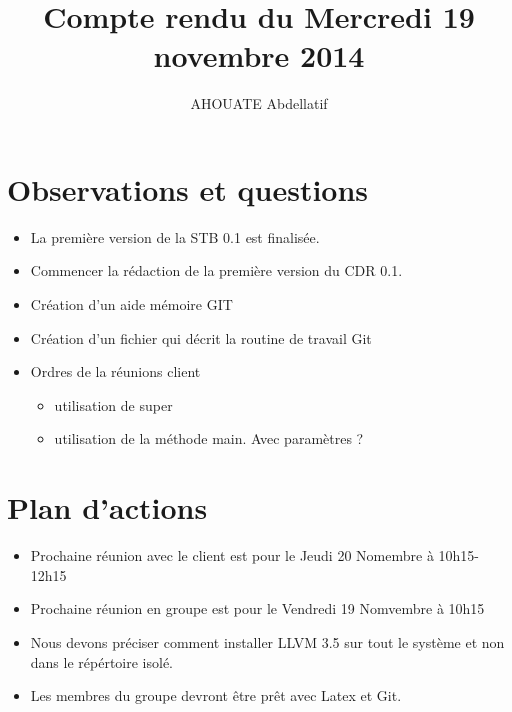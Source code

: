 \documentclass{../../../../../res/rapport}
\author{AHOUATE Abdellatif}
\title{Compte rendu du Mercredi 19 novembre 2014}
\begin{document}
    \maketitle
    \tableofcontents
    \clearpage
    
    \section{Observations et questions} 
    \label{sec:observations_et_questions}
        \begin{itemize}
            \item La première version de la STB 0.1 est finalisée.\\

            \item Commencer la rédaction de la première version du CDR 0.1.\\

            \item Création d'un aide mémoire GIT\\
            \item Création d'un fichier qui décrit la routine de travail Git\\
            \item Ordres de la réunions client
            	\begin{itemize}
            		\item utilisation de super
            		\item utilisation de la méthode main. Avec paramètres ?
            	\end{itemize}
            
        \end{itemize}
        
    \section{Plan d'actions} 
    \label{sec:plan_d_actions}
        \begin{itemize}
            \item Prochaine réunion avec le client est pour le Jeudi 20 Nomembre
                  à 10h15-12h15 
            \item Prochaine réunion en groupe est pour le Vendredi 19 Nomvembre
                   à 10h15
            \item Nous devons préciser comment installer LLVM 3.5 sur tout le 
                  système et non dans le répértoire isolé.
            \item Les membres du groupe devront être prêt avec Latex et Git.
        \end{itemize}
        
        
\end{document}
